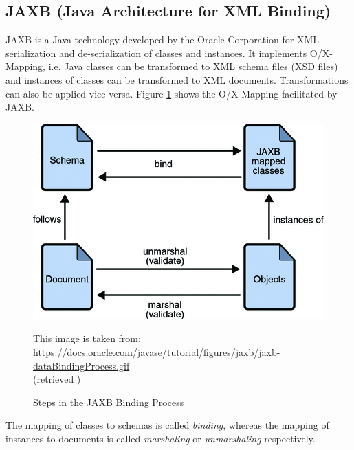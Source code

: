 \subsection{JAXB (Java Architecture for XML Binding)}
\label{subsection:JAXB}
\Gls{JAXB} \cite{JAXB} \cite{JAXBTutorial}
is a \gls{Java} technology developed by the Oracle Corporation for \gls{XML} serialization and de-serialization of classes and instances.
It implements \gls{O/X-Mapping}, i.e. \gls{Java} classes can be transformed to \gls{XML} schema files (\gls{XSD} files) and instances of classes can be transformed to \gls{XML} documents.
Transformations can also be applied vice-versa.
Figure \ref{figure:JAXBDataBindingProcess} shows the \gls{O/X-Mapping} facilitated by \gls{JAXB}.
\begin{figure}[h!]
\begin{center}
\includegraphics[width=\textwidth]{images/jaxb-dataBindingProcess.png}
\end{center}
{
\scriptsize
\begin{center}
This image is taken from:\\
\url{https://docs.oracle.com/javase/tutorial/figures/jaxb/jaxb-dataBindingProcess.gif}\\
(retrieved )
\end{center}
}
\caption{Steps in the JAXB Binding Process \cite{jaxbDataBindingProcess}}
\label{figure:JAXBDataBindingProcess}
\end{figure}
The mapping of classes to schemas is called \textit{binding}, whereas the mapping of instances to documents is called \textit{marshaling} or \textit{unmarshaling} respectively.


